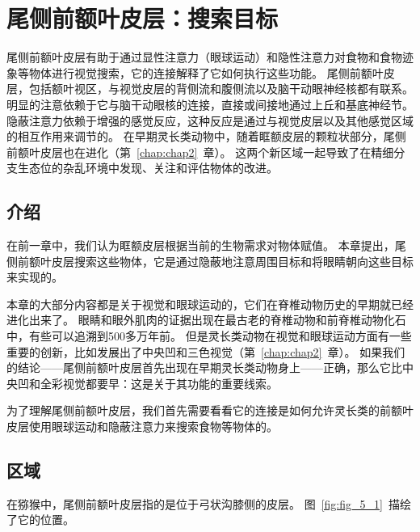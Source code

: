 \chapter{尾侧前额叶皮层：搜索目标} \label{chap:chap5}

尾侧前额叶皮层有助于通过显性注意力（眼球运动）和隐性注意力对食物和食物迹象等物体进行视觉搜索，它的连接解释了它如何执行这些功能。
尾侧前额叶皮层，包括额叶视区，与视觉皮层的背侧流和腹侧流以及脑干动眼神经核都有联系。
明显的注意依赖于它与脑干动眼核的连接，直接或间接地通过上丘和基底神经节。
隐蔽注意力依赖于增强的感觉反应，这种反应是通过与视觉皮层以及其他感觉区域的相互作用来调节的。
在早期灵长类动物中，随着眶额皮层的颗粒状部分，尾侧前额叶皮层也在进化（第~\ref{chap:chap2}~章）。
这两个新区域一起导致了在精细分支生态位的杂乱环境中发现、关注和评估物体的改进。



\section{介绍}

在前一章中，我们认为眶额皮层根据当前的生物需求对物体赋值。
本章提出，尾侧前额叶皮层搜索这些物体，它是通过隐蔽地注意周围目标和将眼睛朝向这些目标来实现的。


本章的大部分内容都是关于视觉和眼球运动的，它们在脊椎动物历史的早期就已经进化出来了。
眼睛和眼外肌肉的证据出现在最古老的脊椎动物和前脊椎动物化石中，有些可以追溯到500多万年前\cite{shu2003head}。
但是灵长类动物在视觉和眼球运动方面有一些重要的创新，比如发展出了中央凹和三色视觉（第~\ref{chap:chap2}~章）。
如果我们的结论——尾侧前额叶皮层首先出现在早期灵长类动物身上——正确，那么它比中央凹和全彩视觉都要早：这是关于其功能的重要线索。


为了理解尾侧前额叶皮层，我们首先需要看看它的连接是如何允许灵长类的前额叶皮层使用眼球运动和隐蔽注意力来搜索食物等物体的。



\section{区域}

在猕猴中，尾侧前额叶皮层指的是位于弓状沟膝侧的皮层。
图~\ref{fig:fig_5_1}~描绘了它的位置。


